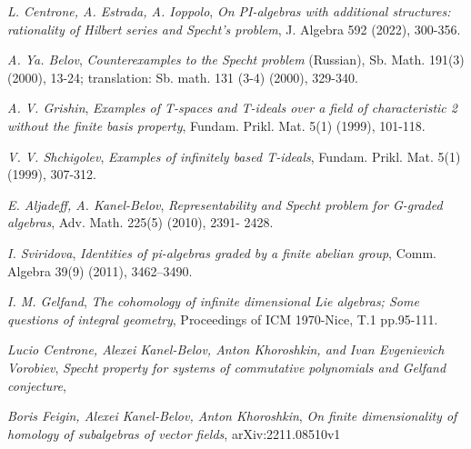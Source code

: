 \documentclass[12pt,a4paper]{article}
\begin{document}
\begin{thebibliography}{10}
         {\sl L. Centrone, A. Estrada, A. Ioppolo}, {\it On PI-algebras with additional structures: rationality of Hilbert series and Specht’s
        problem}, J. Algebra 592 (2022), 300-356.

         {\sl A. Ya. Belov}, {\it Counterexamples to the Specht problem} (Russian), Sb. Math. 191(3) (2000), 13-24; translation: Sb. math.
        131 (3-4) (2000), 329-340.

         {\sl A. V. Grishin}, {\it Examples of T-spaces and T-ideals over a field of characteristic 2 without the finite basis property}, Fundam.
        Prikl. Mat. 5(1) (1999), 101-118.

         {\sl V. V. Shchigolev}, {\it Examples of infinitely based T-ideals}, Fundam. Prikl. Mat. 5(1) (1999), 307-312.

         {\sl E. Aljadeff, A. Kanel-Belov}, {\it Representability and Specht problem for G-graded algebras}, Adv. Math. 225(5) (2010), 2391-
        2428.

         {\sl I. Sviridova}, {\it Identities of pi-algebras graded by a finite abelian group}, Comm. Algebra 39(9) (2011), 3462–3490.

         {\sl I. M. Gelfand}, {\it The cohomology of infinite dimensional Lie algebras; Some questions of integral geometry}, Proceedings of
        ICM 1970-Nice, T.1 pp.95-111.

         {\sl Lucio Centrone, Alexei Kanel-Belov, Anton Khoroshkin, and Ivan Evgenievich Vorobiev}, {\it Specht property for systems of commutative polynomials and Gelfand conjecture},

         {\sl Boris Feigin, Alexei Kanel-Belov, Anton Khoroshkin}, {\it On finite dimensionality of homology of subalgebras of vector
        fields}, arXiv:2211.08510v1

    \end{thebibliography}
\end{document}
